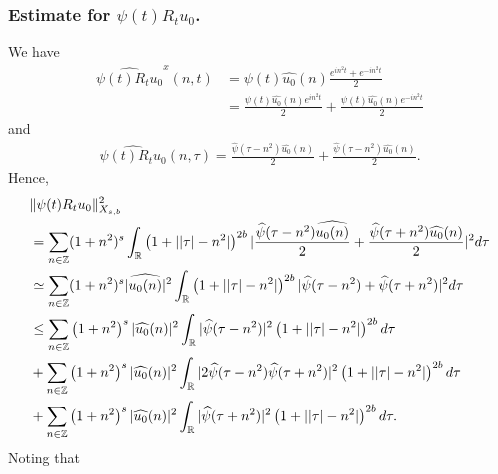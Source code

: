 \documentclass[12pt,reqno]{amsart}
\numberwithin{equation}{section}  %
\numberwithin{figure}{section}
\newcommand{\rr}{\mathbb{R}}
\newcommand{\zz}{\mathbb{Z}}
\newcommand{\wh}{\widehat}
\theoremstyle{plain}
\theoremstyle{definition}
\theoremstyle{remark}
\begin{document}
\subsubsection{Estimate for $\psi(t) R_{t}u_{0}$.} 
\label{sssec:est-init-term-1}
We have
%
%
\begin{equation*}
  \begin{split}
    \wh{\psi(t)R_{t}u_{0}}^{x}(n, t)
    & = \psi(t) \wh{u_{0}}(n) \frac{e^{in^2 t} + e^{-in^{2}t}}{2}
    \\
    & = \frac{\psi(t) \wh{u_{0}}(n)e^{in^{2}t}}{2} + \frac{\psi(t)
    \wh{u_{0}}(n)e^{-in^{2}t}}{2}  
  \end{split}
\end{equation*}
%
%
and
%
%
\begin{equation*}
  \begin{split}
    \wh{\psi(t) R_{t}u_{0}}(n, \tau) = \frac{\wh{\psi}(\tau -
    n^{2})\wh{u_{0}}(n)}{2} + \frac{\wh{\psi}(\tau - n^{2})\wh{u_{0}}(n)}{2}.
  \end{split}
\end{equation*}
%
%
Hence,
%
%
\begin{align}
    & \| \psi(t) R_{t}u_{0} \|_{X_{s,b}}^{2} 
    \notag
    \\
    & = \sum_{n \in \zz}(1 + n^{2})^{s} \int_{\rr}\left( 1 + | | \tau
    |-n^{2} | \right)^{2b} | \frac{\wh{\psi}(\tau - n^{2})\wh{u_{0}(n)}}{2} +
    \frac{\wh{\psi}(\tau + n^{2})\wh{u_{0}}(n)}{2} |^{2} d \tau
    \notag
    \\
    & \simeq \sum_{n \in \zz}(1 + n^{2})^{s} | \wh{u_{0}(n)} |^{2} \int_{\rr}
    \left( 1 + | | \tau | - n^{2} | \right)^{2b} | \wh{\psi}(\tau - n^{2}) +
    \wh{\psi}(\tau + n^{2}) |^{2} d \tau
    \notag
    \\
    & \le \sum_{n \in \zz} \left( 1 + n^{2} \right)^{s} | \wh{u_{0}}(n)
    |^{2} \int_{\rr} | \wh{\psi}(\tau - n^{2}) |^{2}\left( 1 + | | \tau | -
    n^{2} | \right)^{2b} d \tau
    \label{u-0-norm-comp-1}
    \\
    & + \sum_{n \in \zz} \left( 1 + n^{2} \right)^{s} | \wh{u_{0}}(n)
    |^{2} \int_{\rr} | 2\wh{\psi}(\tau - n^{2})\wh{\psi}(\tau + n^{2}) |^{2}\left( 1 + | | \tau | -
    n^{2} | \right)^{2b} d \tau
    \label{u-0-norm-comp-2}
    \\
    & + \sum_{n \in \zz} \left( 1 + n^{2} \right)^{s} | \wh{u_{0}}(n)
    |^{2} \int_{\rr} | \wh{\psi}(\tau + n^{2}) |^{2}\left( 1 + | | \tau | -
    n^{2} | \right)^{2b} d \tau.
    \label{u-0-norm-comp-3}
\end{align}
%
Noting that
\end{document}
